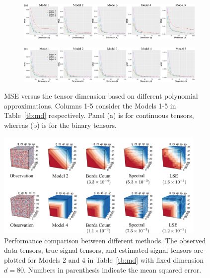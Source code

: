 \documentclass[12pt]{article}
\theoremstyle{definition}
\begin{document}
\begin{figure}[h!]
    \centering
    \begin{subfigure}[b]{\textwidth}
    \vspace{0.5cm}
    
    \includegraphics[width = \textwidth]{figure/deg_dim_c.pdf} 
    \vspace{0cm}
    \end{subfigure}
    \begin{subfigure}[b]{\textwidth}
    \includegraphics[width =\textwidth]{figure/deg_dim_b.pdf}    
    \end{subfigure}
    \caption{MSE versus the tensor dimension based on different polynomial approximations. Columns 1-5 consider the Models 1-5 in Table~\ref{tb:md} respectively. Panel (a) is for continuous tensors, whereas (b) is for the binary tensors.}
    \label{fig:degdim}
\end{figure}


\begin{figure}[htp!]
    \centering
    \includegraphics[width =0.9\textwidth]{figure/extravfinal.pdf}
    \caption{Performance comparison between different methods. The observed data tensors, true signal tensors, and estimated signal tensors are plotted for Models 2 and 4 in Table~\ref{tb:md} with fixed dimension $d = 80$. Numbers in parenthesis indicate the mean squared error.}
    \label{fig:extrav}
\end{figure}
\end{document}
